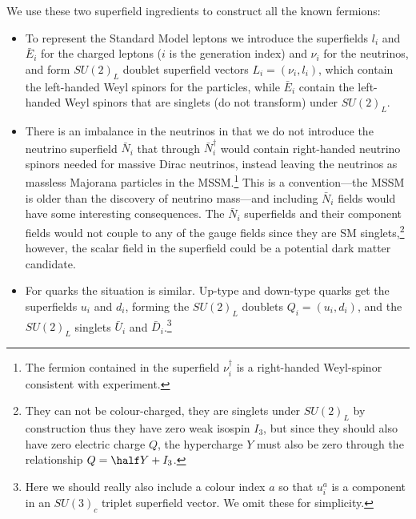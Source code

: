 \documentclass[notes.tex]{subfiles}
\begin{document}
We use these two superfield ingredients to construct all the known fermions:
\begin{itemize}
\item To represent the Standard Model leptons we introduce the superfields $l_i$ and $\bar{E}_i$ for the charged leptons ($i$ is the generation index) and $\nu_i$ for the neutrinos, and form $SU(2)_L$ doublet superfield vectors $L_i = (\nu_i, l_i)$, which contain the left-handed Weyl spinors for the particles, while $\bar{E}_i$  contain the left-handed Weyl spinors that are singlets (do not transform) under $SU(2)_L$.
\item There is an imbalance in the neutrinos in that we do not introduce the neutrino superfield $\bar{N}_i$ that through $\bar{N}_i^\dagger$ would contain right-handed neutrino spinors needed for massive Dirac neutrinos, instead leaving the neutrinos as massless Majorana particles in the MSSM.\footnote{The fermion contained in the superfield $\nu_i^\dagger$ is a right-handed Weyl-spinor consistent with experiment.}
This is a convention---the MSSM is older than the discovery of neutrino mass---and including $\bar{N}_i$ fields would have some interesting consequences.
The $\bar{N}_i$ superfields and their component fields would not couple to any of the gauge fields since they are SM singlets,\footnote{They can not be colour-charged, they are singlets under $SU(2)_L$ by construction thus they have zero weak isospin $I_3$, but since they should also have zero electric charge $Q$, the hypercharge $Y$ must also be zero through the relationship $Q=\half Y+I_3$.} however, the scalar field in the superfield could be a potential dark matter candidate.
\item For quarks the situation is similar. Up-type and down-type quarks get the superfields $u_i$ and $d_i$,  forming the $SU(2)_L$ doublets $Q_i = (u_i, d_i)$, and the $SU(2)_L$  singlets $\bar{U}_i$ and $\bar{D}_i$.\footnote{Here we should really also include a colour index $a$ so that $u_i^a$ is a component in an $SU(3)_c$ triplet superfield vector. We omit these for simplicity.}
\end{itemize}
\end{document}
